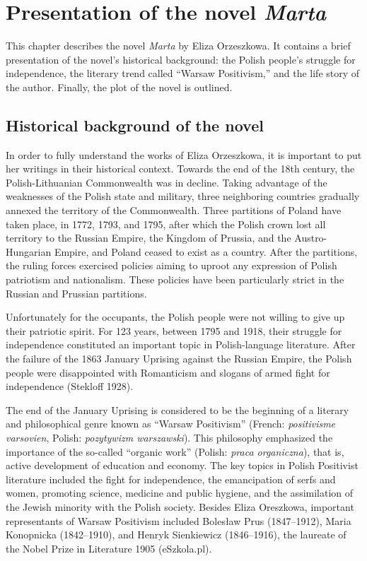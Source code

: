\chapter{Presentation of the novel \textit{Marta}}
This chapter describes the novel \textit{Marta} by Eliza Orzeszkowa.
It contains a brief presentation of the novel's historical background: the Polish people's struggle for independence, the literary trend called ``Warsaw Positivism,'' and the life story of the author.
Finally, the plot of the novel is outlined.

\section{Historical background of the novel}

In order to fully understand the works of Eliza Orzeszkowa, it is important to put her writings in their historical context.
Towards the end of the 18th century, the Polish-Lithuanian Commonwealth was in decline.
Taking advantage of the weaknesses of the Polish state and military, three neighboring countries gradually annexed the territory of the Commonwealth.
Three partitions of Poland have taken place, in 1772, 1793, and 1795, after which the Polish crown lost all territory to the Russian Empire, the Kingdom of Prussia, and the Austro-Hungarian Empire, and Poland ceased to exist as a country.
After the partitions, the ruling forces exercised policies aiming to uproot any expression of Polish patriotism and nationalism.
These policies have been particularly strict in the Russian and Prussian partitions.

Unfortunately for the occupants, the Polish people were not willing to give up their patriotic spirit.
For 123 years, between 1795 and 1918, their struggle for independence constituted an important topic in Polish-language literature.
After the failure of the 1863 January Uprising against the Russian Empire, the Polish people were disappointed with Romanticism and slogans of armed fight for independence
(Stekloff 1928).

The end of the January Uprising is considered to be the beginning of a literary and philosophical genre known as ``Warsaw Positivism'' (French: \textit{positivisme varsovien}, Polish: \textit{pozytywizm warszawski}).
This philosophy emphasized the importance of the so-called ``organic work'' (Polish: \textit{praca organiczna}), that is, active development of education and economy.
The key topics in Polish Positivist literature included the fight for independence, the emancipation of serfs and women, promoting science, medicine and public hygiene, and the assimilation of the Jewish minority with the Polish society.
Besides Eliza Oreszkowa, important representants of Warsaw Positivism included Bolesław Prus (1847--1912), Maria Konopnicka (1842--1910), and Henryk Sienkiewicz (1846--1916), the laureate of the Nobel Prize in Literature 1905
(eSzkola.pl).

